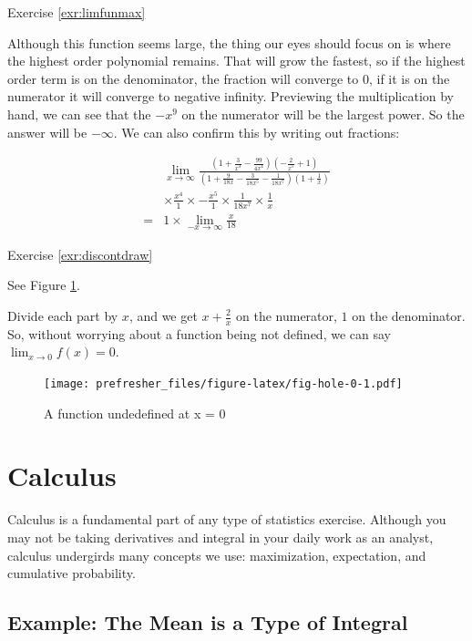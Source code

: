 \documentclass[]{book}
\theoremstyle{definition}
\theoremstyle{definition}
\theoremstyle{definition}
\theoremstyle{remark}
\let\BeginKnitrBlock\begin \let\EndKnitrBlock\end
\begin{document}
Exercise \ref{exr:limfunmax}

\BeginKnitrBlock{solution}
{}Although this function seems large, the
thing our eyes should focus on is where the highest order polynomial
remains. That will grow the fastest, so if the highest order term is on
the denominator, the fraction will converge to 0, if it is on the
numerator it will converge to negative infinity. Previewing the
multiplication by hand, we can see that the \(-x^9\) on the numerator
will be the largest power. So the answer will be \(-\infty\). We can
also confirm this by writing out fractions:

\begin{align*}  
& \lim_{x\to\infty}\frac{\left(1 + \frac{3}{x^3} - \frac{99}{4x^4}\right)\left(-\frac{2}{x^5} + 1\right)}{\left(1 + \frac{9}{18x} - \frac{3}{18x^5} - \frac{1}{18x^7} \right)\left(1 + \frac{1}{x}\right)} \\
&\times \frac{x^4}{1} \times -\frac{x^5}{1} \times \frac{1}{18x^7}\times \frac{1}{x}\\
=& 1 \times \lim_{-x\to\infty} \frac{x}{18}
\end{align*}
\EndKnitrBlock{solution}

Exercise \ref{exr:discontdraw}

\BeginKnitrBlock{solution}
{} See Figure \ref{fig:fig-hole-0}.

Divide each part by \(x\), and we get \(x + \frac{2}{x}\) on the
numerator, \(1\) on the denominator. So, without worrying about a
function being not defined, we can say \(\lim_{x\to 0}f(x) = 0\).
\EndKnitrBlock{solution}

\begin{figure}
\centering
\texttt{[image: prefresher\_files/figure-latex/fig-hole-0-1.pdf]}
\caption{\label{fig:fig-hole-0}A function undedefined at x = 0}
\end{figure}

\chapter{Calculus}\label{derivatives}

Calculus is a fundamental part of any type of statistics exercise.
Although you may not be taking derivatives and integral in your daily
work as an analyst, calculus undergirds many concepts we use:
maximization, expectation, and cumulative probability.

\section*{Example: The Mean is a Type of
Integral}\label{example-the-mean-is-a-type-of-integral}
\end{document}
